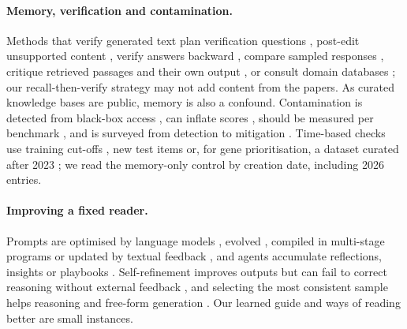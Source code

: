 \documentclass{article} %
\begin{document}
\paragraph{Memory, verification and contamination.}
Methods that verify generated text plan verification questions \citep{dhuliawala2024chainofverification}, post-edit unsupported content \citep{Gao2022RarrResearching}, verify answers backward \citep{Weng2022LargeLanguage}, compare sampled responses \citep{Manakul2023SelfcheckgptZeroresource}, critique retrieved passages and their own output \citep{Asai2023SelfragLearning}, or consult domain databases \citep{wang2025geneagent}; our recall-then-verify strategy may not add content from the papers. As curated knowledge bases are public, memory is also a confound. Contamination is detected from black-box access \citep{Shi2023DetectingPretraining,oren2024proving,golchin2024time,Golchin2025DataContamination}, can inflate scores \citep{Zhou2023DontMake,Singh2024EvaluationData}, should be measured per benchmark \citep{sainz2024nlp}, and is surveyed from detection to mitigation \citep{Xu2024BenchmarkData,Chen2025RecentAdvances,Cheng2025SurveyData,Deng2024UnveilingSpectrum,Ravaut2024ComprehensiveSurvey}. Time-based checks use training cut-offs \citep{Roberts2023DataContamination}, new test items \citep{Jain2024LivecodebenchHolistic,White2024LivebenchChallenging} or, for gene prioritisation, a dataset curated after 2023 \citep{Kim2024AssessingUtility}; we read the memory-only control by creation date, including 2026 entries.

\paragraph{Improving a fixed reader.}
Prompts are optimised by language models \citep{Zhou2022LargeLanguage,Pryzant2023AutomaticPrompt,Yang2023LargeLanguage}, evolved \citep{Guo2023EvopromptConnecting,Fernando2023PromptbreederSelfreferential,agrawal2026gepa}, compiled in multi-stage programs \citep{Khattab2023DspyCompiling,Opsahlong2024OptimizingInstructions} or updated by textual feedback \citep{Yuksekgonul2024TextgradAutomatic}, and agents accumulate reflections, insights or playbooks \citep{Shinn2023ReflexionLanguage,Zhao2023ExpelLlm,Zhang2025AgenticContext}. Self-refinement improves outputs \citep{Madaan2023SelfrefineIterative} but can fail to correct reasoning without external feedback \citep{Huang2023LargeLanguage}, and selecting the most consistent sample helps reasoning \citep{Wang2022SelfconsistencyImproves} and free-form generation \citep{Chen2023UniversalSelfconsistency}. Our learned guide and ways of reading better are small instances.
\end{document}
